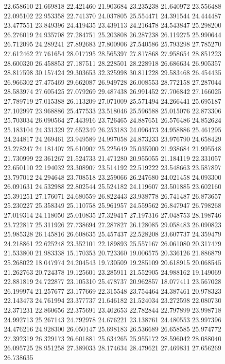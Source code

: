 22.658610
21.669818
22.421460
21.903684
23.235238
21.640972
23.556488
22.095102
22.953358
22.741370
24.037805
25.554471
24.391544
24.444487
23.477551
23.849396
24.419435
23.439113
24.216478
24.543847
25.298200
26.276019
24.935708
27.284751
25.203808
26.287238
26.119275
25.990644
26.712095
24.289241
27.892683
27.800906
27.540586
25.793298
27.785270
27.612462
27.761654
28.017795
28.565397
27.817868
27.958654
28.851223
28.600320
26.458853
27.187511
28.228501
28.228918
26.686634
26.905357
28.817598
30.157424
29.303653
32.325998
30.811228
29.583468
26.454435
26.966302
27.475469
29.662087
26.949728
26.008553
28.772158
27.287044
28.583974
27.605425
27.079269
29.487438
26.991452
27.706842
27.166025
27.789719
27.015388
26.113209
27.071009
25.571494
24.266441
25.695187
27.102997
23.968886
25.477533
23.518046
25.596588
25.015076
22.873306
25.703034
26.090564
27.443916
23.726465
24.887651
26.576486
24.852624
25.183104
24.331329
27.652349
26.253183
24.096473
24.958886
25.461295
24.244817
24.269461
23.949589
24.997058
24.873233
23.976790
24.658429
23.278247
24.181407
25.610907
25.225649
25.035900
21.938684
21.995548
21.730999
22.361267
21.524733
21.471280
20.955055
21.184119
22.331057
22.650110
22.194032
23.308907
23.514192
22.519222
23.548663
23.587897
23.797012
24.294648
23.708518
23.259066
26.247680
24.021458
24.093300
26.091631
24.532988
22.802544
25.524182
24.119607
23.501885
23.602160
25.391251
27.176071
24.680559
26.822443
23.938778
26.741487
26.873657
25.230227
25.358349
25.110758
25.961957
24.559562
26.847947
26.798268
27.019314
24.118050
25.010835
27.329417
27.197316
27.048753
28.198746
23.722817
25.311926
27.738694
27.287827
26.128085
29.058483
26.090823
25.985328
26.145816
26.608635
25.457437
22.528208
23.607737
24.359479
24.218861
22.625248
23.352101
22.189893
25.557167
26.061080
20.317479
21.533800
21.983338
15.170353
20.723360
19.006575
20.336126
21.886879
25.268022
18.047974
24.204543
19.730509
19.285109
20.618915
20.068545
21.262763
20.724378
19.125601
23.285911
21.552905
24.988162
19.149069
22.881819
24.722877
23.105310
25.478737
20.962857
18.077411
23.567028
26.199974
21.257677
23.177669
22.315548
23.754464
24.387461
20.978323
22.143473
24.761994
23.377737
21.646182
21.524034
23.272598
22.080730
22.371231
22.860656
22.375691
23.402653
22.782844
22.797899
23.998718
24.992713
25.267143
24.792978
24.676221
23.138761
24.480553
23.997396
24.476216
24.928300
26.050147
25.698183
26.536689
26.658585
25.974772
27.392319
26.329173
26.601881
25.634265
25.955172
28.596042
28.088040
26.095725
28.951258
27.389033
28.174634
28.479621
27.469831
27.656269
26.738635
